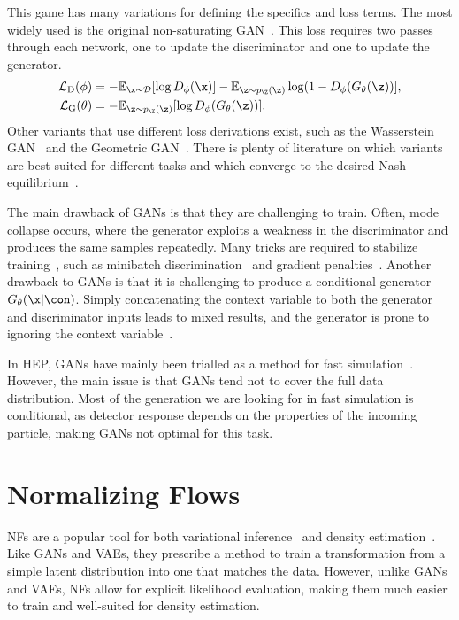 This game has many variations for defining the specifics and loss terms.
The most widely used is the original non-saturating GAN~\cite{GenerativeAdversarialNetworks}.
This loss requires two passes through each network, one to update the discriminator and one to update the generator.
\begin{align}
    \mathcal{L}_{\text{D}}(\phi) &= -\mathbb{E}_{\x \sim \mathcal{D}}[\log D_{\phi}(\x)] - \mathbb{E}_{\z \sim p_\Z(\z)}\log(1 - D_{\phi}(G_{\theta}(\z))], \\
    \mathcal{L}_{\text{G}}(\theta) &= -\mathbb{E}_{\z \sim p_\Z(\z)}[\log D_{\phi}(G_{\theta}(\z))].
\end{align}
Other variants that use different loss derivations exist, such as the Wasserstein GAN~\cite{WGAN1} and the Geometric GAN~\cite{GeometricGAN}.
There is plenty of literature on which variants are best suited for different tasks and which converge to the desired Nash equilibrium~\cite{WhichTrainingMethods}.

The main drawback of GANs is that they are challenging to train.
Often, mode collapse occurs, where the generator exploits a weakness in the discriminator and produces the same samples repeatedly.
Many tricks are required to stabilize training~\cite{WhichTrainingMethods}, such as minibatch discrimination~\cite{ProGAN} and gradient penalties~\cite{WGAN}.
Another drawback to GANs is that it is challenging to produce a conditional generator $G_\theta(\x|\con)$.
Simply concatenating the context variable to both the generator and discriminator inputs leads to mixed results, and the generator is prone to ignoring the context variable~\cite{cGAN}.

In HEP, GANs have mainly been trialled as a method for fast simulation~\cite{MPGAN, GAPT, CaloGAN, EPICGAN}.
However, the main issue is that GANs tend not to cover the full data distribution.
Most of the generation we are looking for in fast simulation is conditional, as detector response depends on the properties of the incoming particle, making GANs not optimal for this task.

\section{Normalizing Flows}

NFs are a popular tool for both variational inference~\cite{VariationalInferenceNormalizing, NormalizingFlowsProbabilistic}
and density estimation~\cite{NICENonlinearIndependent}.
Like GANs and VAEs, they prescribe a method to train a transformation from a simple latent distribution into one that matches the data.
However, unlike GANs and VAEs, NFs allow for explicit likelihood evaluation, making them much easier to train and well-suited for density estimation.

